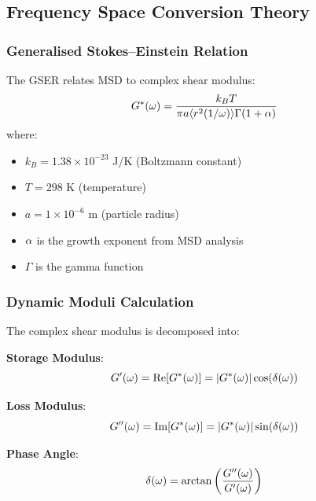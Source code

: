 \subsection{Frequency Space Conversion Theory}

\subsubsection{Generalised Stokes--Einstein Relation}
The GSER relates MSD to complex shear modulus:
\begin{equation}
G^*(\omega) = \frac{k_B T}{\pi a \langle r^2(1/\omega) \rangle \Gamma(1 + \alpha)}
\end{equation}
where:
\begin{itemize}
    \item $k_B = 1.38 \times 10^{-23}$ J/K (Boltzmann constant)
    \item $T = 298$ K (temperature)
    \item $a = 1 \times 10^{-6}$ m (particle radius)
    \item $\alpha$ is the growth exponent from MSD analysis
    \item $\Gamma$ is the gamma function
\end{itemize}

\subsubsection{Dynamic Moduli Calculation}
The complex shear modulus is decomposed into:

\textbf{Storage Modulus}:
\begin{equation}
G'(\omega) = \text{Re}[G^*(\omega)] = |G^*(\omega)| \cos(\delta(\omega))
\end{equation}

\textbf{Loss Modulus}:
\begin{equation}
G''(\omega) = \text{Im}[G^*(\omega)] = |G^*(\omega)| \sin(\delta(\omega))
\end{equation}

\textbf{Phase Angle}:
\begin{equation}
\delta(\omega) = \arctan\left(\frac{G''(\omega)}{G'(\omega)}\right)
\end{equation}
